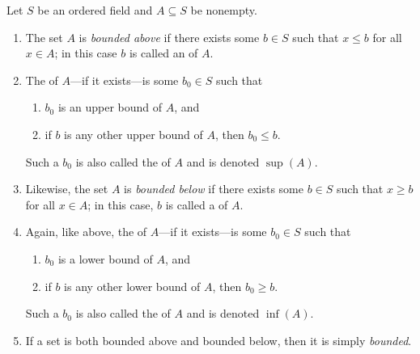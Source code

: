 \documentclass[11pt,twoside=off,numbers=noenddot]{scrbook}
\begin{document}
\begin{definition}
    Let $S$ be an ordered field and $A \subseteq S$ be nonempty.
    \begin{enumerate}
        \item The set $A$ is \textit{bounded above} if there exists some $b \in S$ such that $x \leq b$ for all $x \in A$; in this case $b$ is called an  of $A$.
        \item The  of $A$—if it exists—is some $b_0 \in S$ such that
        \begin{enumerate}
            \item $b_0$ is an upper bound of $A$, and
            \item if $b$ is any other upper bound of $A$, then $b_0 \leq b$. 
        \end{enumerate}
        Such a $b_0$ is also called the  of $A$ and is denoted $\sup(A)$.
        \item Likewise, the set $A$ is \textit{bounded below} if there exists some $b \in S$ such that $x \geq b$ for all $x \in A$; in this case, $b$ is called a  of $A$.
        \item Again, like above, the  of $A$—if it exists—is some $b_0 \in S$ such that
        \begin{enumerate}
            \item $b_0$ is a lower bound of $A$, and
            \item if $b$ is any other lower bound of $A$, then $b_0 \geq b$.
        \end{enumerate}
        Such a $b_0$ is also called the  of $A$ and is denoted $\inf(A)$.
        \item If a set is both bounded above and bounded below, then it is simply \textit{bounded}.
    \end{enumerate}
\end{definition}
\end{document}
